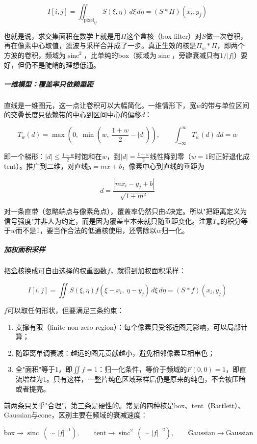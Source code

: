 \[
I[i,j] = \iint_{\text{pixel}_{ij}} S(\xi,\eta)\,d\xi\,d\eta = (S*\Pi)(x_i,y_j)
\]

也就是说，求交集面积在数学上就是用$\Pi$这个盒核（box filter）对$S$做一次卷积，再在像素中心取值，滤波与采样合并成了一步。真正生效的核是$\Pi_w*\Pi$，即两个方波的卷积，频域为$\operatorname{sinc}^2$，比单纯的box（频域为$\operatorname{sinc}$，旁瓣衰减只有$1/|f|$）要好，但仍不是陡峭的理想低通。

\subparagraph{一维模型：覆盖率只依赖垂距}

直线是一维图元，这一点让卷积可以大幅简化。一维情形下，宽$w$的带与单位区间的交叠长度只依赖带的中心到区间中心的偏移$d$：

\[
T_w(d) = \max\left(0,\ \min\left(w,\ \frac{1+w}{2}-|d|\right)\right), \qquad \int_{-\infty}^{\infty}T_w(d)\,dd = w
\]

即一个梯形：$|d|\le\frac{1-w}{2}$时饱和在$w$，到$|d| = \frac{1+w}{2}$线性降到零（$w=1$时正好退化成tent）。推广到二维，对直线$y = mx+b$，像素中心到直线的垂距为

\[
d = \frac{|mx_i - y_j + b|}{\sqrt{1+m^2}}
\]

对一条直带（忽略端点与像素角点），覆盖率仍然只由$d$决定。所以"把距离定义为信号强度"并非人为约定，而是因为覆盖率本来就只随垂距变化。注意$T_w$的积分等于$w$而不是1，要当作合法的低通核使用，还需除以$w$归一化。

\subparagraph{加权面积采样}

把盒核换成可自由选择的权重函数$f$，就得到加权面积采样：

\[
I[i,j] = \iint S(\xi,\eta)f(\xi - x_i,\ \eta - y_j)\,d\xi\,d\eta = (S*f)(x_i,y_j)
\]

$f$可以取任何形状，但要满足三条约束：

\begin{enumerate}[nosep]
\item 支撑有限（finite non-zero region）：每个像素只受邻近图元影响，可以局部计算；
\item 随距离单调衰减：越远的图元贡献越小，避免相邻像素互相串色；
\item 全"面积"等于1，即$\iint f = 1$：归一化条件，等价于频域的$F(0,0) = 1$，即直流增益为1。只有这样，一整片纯色区域采样后仍是原来的纯色，不会被压暗或者提亮。
\end{enumerate}

前两条只关乎"合理"，第三条是硬性的。常见的四种核是box、tent（Bartlett）、Gaussian与cone，区别主要在频域的衰减速度：

\[
\text{box}\to\operatorname{sinc}\ (\sim |f|^{-1}),\qquad
\text{tent}\to\operatorname{sinc}^2\ (\sim |f|^{-2}),\qquad
\text{Gaussian}\to\text{Gaussian}
\]

